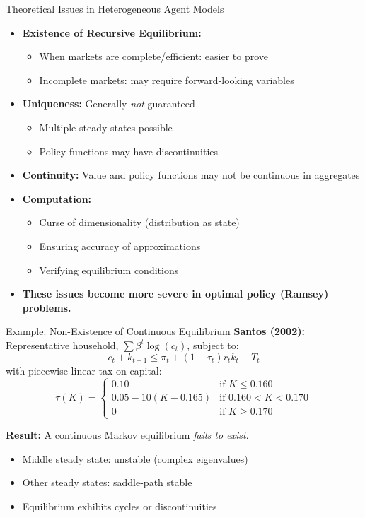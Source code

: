 \begin{frame}{Theoretical Issues in Heterogeneous Agent Models}
\begin{itemize}
\item \textbf{Existence of Recursive Equilibrium:}
\begin{itemize}
    \item When markets are complete/efficient: easier to prove
    \item Incomplete markets: may require forward-looking variables
\end{itemize}

\medskip
\item \textbf{Uniqueness:} Generally \emph{not} guaranteed
\begin{itemize}
    \item Multiple steady states possible
    \item Policy functions may have discontinuities
\end{itemize}

\medskip
\item \textbf{Continuity:} Value and policy functions may not be continuous in aggregates

\medskip
\item \textbf{Computation:}
\begin{itemize}
    \item Curse of dimensionality (distribution as state)
    \item Ensuring accuracy of approximations
    \item Verifying equilibrium conditions
\end{itemize}

\medskip
\item \textbf{These issues become more severe in optimal policy (Ramsey) problems.}
\end{itemize}
\end{frame}

\begin{frame}{Example: Non-Existence of Continuous Equilibrium}
\textbf{Santos (2002):} Representative household, $\sum \beta^t \log(c_t)$, subject to:
\[
c_{t}+k_{t+1} \leq \pi_{t}+(1-\tau_{t})r_{t}k_{t}+T_{t}
\]
with piecewise linear tax on capital:
\[
\tau(K) = \begin{cases}
0.10 & \text{if } K \leq 0.160 \\
0.05 - 10(K - 0.165) & \text{if } 0.160 < K < 0.170 \\
0 & \text{if } K \geq 0.170
\end{cases}
\]

\medskip
\textbf{Result:} A continuous Markov equilibrium \emph{fails to exist}.
\begin{itemize}
    \item Middle steady state: unstable (complex eigenvalues)
    \item Other steady states: saddle-path stable
    \item Equilibrium exhibits cycles or discontinuities
\end{itemize}
\end{frame}

